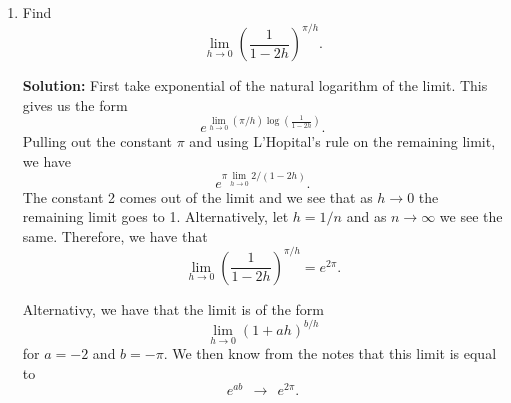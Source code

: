 \documentclass[11pt]{article}
\def\f{\frac }
\begin{document}
\begin{enumerate}
\item Find \[ \lim _{h\to 0} \left ( \f{1}{1-2h} \right ) ^{\pi / h} .\]

{\bf Solution:} First take exponential of the natural logarithm of the limit.
This gives us the form
\[ e^{\lim _{h\to 0} (\pi /h )\log \left ( \f{1}{1-2h} \right )} .\]
Pulling out the constant $\pi$ and using L'Hopital's rule on the remaining limit, we have
\[ e^{\pi \lim _{h\to 0} 2 / \left ( 1-2h \right ) } .\]
The constant 2 comes out of the limit and we see that as $h\to 0$ the remaining limit goes to 1.
Alternatively, let $h=1/n$ and as $n\to \infty$ we see the same.
Therefore, we have that
\[ \lim _{h\to 0} \left ( \f{1}{1-2h} \right ) ^{\pi / h}  = e^{2\pi} .\]

Alternativy, we have that the limit is of the form
\[ \lim _{h\to 0} (1 + ah ) ^{b/h} \]
for $a=-2$ and $b=-\pi$. We then know from the notes that this limit is equal to
\[ e^{ab} ~~\to~~ e^{2\pi} .\]
\end{enumerate}
\end{document}
